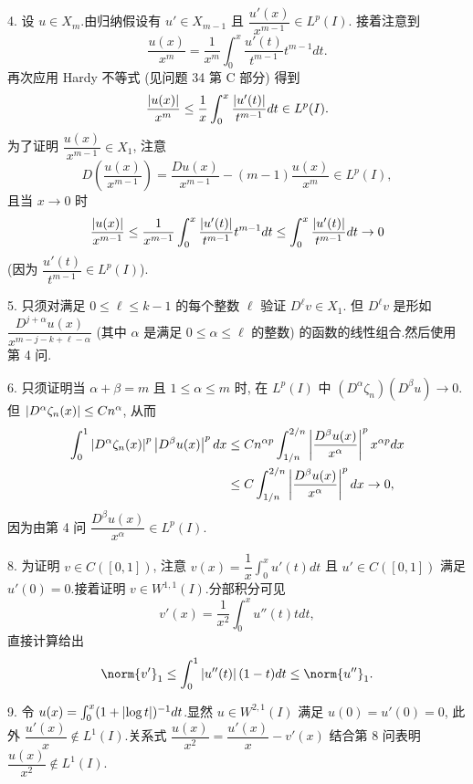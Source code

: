 4. 设 $u\in X_m$.由归纳假设有 $u'\in X_{m-1}$ 且 $\dfrac{u'(x)}{x^{m-1}}\in L^p(I)$.
接着注意到
\begin{equation*}
\frac{u(x)}{x^m}=\frac{1}{x^m}\int_0^x\frac{u'(t)}{t^{m-1}}t^{m-1}dt.
\end{equation*}
再次应用 Hardy 不等式 (见问题 34 第 C 部分) 得到
\begin{equation*}
\frac{\left|u(x)\right|}{x^m}\le\frac1x\int_0^x\frac{\left|u'(t)\right|}{t^{m-1}}dt\in L^p(I).
\end{equation*}
为了证明 $\dfrac{u(x)}{x^{m-1}}\in X_1$, 注意
\begin{equation*}
D\left(\frac{u(x)}{x^{m-1}}\right)=\frac{Du(x)}{x^{m-1}}-(m-1)\frac{u(x)}{x^m}\in L^p(I),
\end{equation*}
且当 $x\to0$ 时
\begin{equation*}
\frac{\left|u(x)\right|}{x^{m-1}}\le\frac{1}{x^{m-1}}\int_0^x\frac{\left|u'(t)\right|}{t^{m-1}}t^{m-1}dt
\le\int_0^x\frac{\left|u'(t)\right|}{t^{m-1}}dt\to0
\end{equation*}
(因为 $\dfrac{u'(t)}{t^{m-1}}\in L^p(I)$).

5. 只须对满足 $0\le\ell\le k-1$ 的每个整数 $\ell$ 验证 $D^\ell v\in X_1$.
但 $D^\ell v$ 是形如 $\dfrac{D^{j+\alpha}u(x)}{x^{m-j-k+\ell-\alpha}}$ (其中
$\alpha$ 是满足 $0\le\alpha\le\ell$ 的整数) 的函数的线性组合.然后使用第 4 问.

6. 只须证明当 $\alpha+\beta=m$ 且 $1\le\alpha\le m$ 时, 在 $L^p(I)$ 中
$(D^\alpha\zeta_n)(D^\beta u)\to0$.但 $\left|D^\alpha\zeta_n(x)\right|\le Cn^\alpha$,
从而
\begin{align*}
\int_0^1\left|D^\alpha\zeta_n(x)\right|^p\left|D^\beta u(x)\right|^pdx
&\le Cn^{\alpha p}\int_{1/n}^{2/n}\left|\frac{D^\beta u(x)}{x^\alpha}\right|^px^{\alpha p}dx\\
&\le C\int_{1/n}^{2/n}\left|\frac{D^\beta u(x)}{x^\alpha}\right|^pdx\to0,
\end{align*}
因为由第 4 问 $\dfrac{D^\beta u(x)}{x^\alpha}\in L^p(I)$.

8. 为证明 $v\in C([0,1])$, 注意 $v(x)=\dfrac1x\int_0^xu'(t)dt$ 且 $u'\in C([0,1])$
满足 $u'(0)=0$.接着证明 $v\in W^{1,1}(I)$.分部积分可见
\begin{equation*}
v'(x)=\frac{1}{x^2}\int_0^xu''(t)tdt,
\end{equation*}
直接计算给出
\begin{equation*}
\norm{v'}_1\le\int_0^1\abs{u''(t)}(1-t)dt\le\norm{u''}_1.
\end{equation*}

9. 令 $u(x)=\int_0^x(1+\left|\log t\right|)^{-1}dt$.显然 $u\in W^{2,1}(I)$ 满足
$u(0)=u'(0)=0$, 此外 $\dfrac{u'(x)}{x}\notin L^1(I)$.关系式
$\dfrac{u(x)}{x^2}=\dfrac{u'(x)}{x}-v'(x)$ 结合第 8 问表明
$\dfrac{u(x)}{x^2}\notin L^1(I)$.

